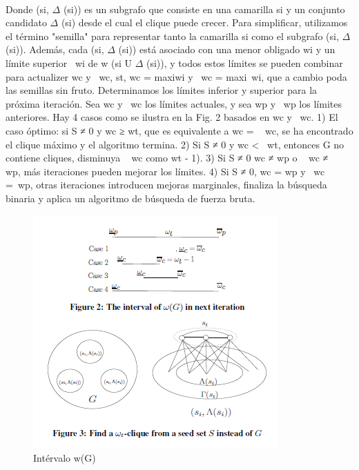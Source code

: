 \\
Donde (si, \begin{math}\Delta\end{math} (si)) es un subgrafo que consiste en una camarilla si y un conjunto candidato  \begin{math}\Delta\end{math} (si) desde el cual el clique puede crecer. Para simplificar, utilizamos el término "semilla" para representar tanto la camarilla si como el subgrafo (si,  \begin{math}\Delta\end{math} (si)). Además, cada (si,  \begin{math}\Delta\end{math} (si)) está asociado con una menor obligado wi y un límite superior ~wi de w (si U  \begin{math}\Delta\end{math} (si)), y todos estos límites se pueden combinar para actualizer wc y ~wc, st, wc = maxi{wi} y ~wc = maxi{~wi}, que a cambio poda las semillas sin fruto.
Determinamos los límites inferior y superior para la próxima iteración. Sea wc y ~wc los límites actuales, y sea wp y ~wp los límites anteriores. Hay 4 casos como se ilustra en la Fig. 2 basados en wc y ~wc.
1) El caso óptimo: si S ≠ 0 y wc ≥ wt, que es equivalente a wc = ~ wc, se ha encontrado el clique máximo y el algoritmo termina.
2) Si S ≠ 0 y wc < ~wt, entonces G no contiene cliques, disminuya ~ wc como wt - 1).
3) Si S ≠ 0 wc  ≠ wp o ~ wc ≠ ~ wp, más iteraciones pueden mejorar los límites.
4) Si S ≠ 0, wc = wp y ~wc =~wp, otras iteraciones introducen mejoras marginales, finaliza la búsqueda binaria y aplica un algoritmo de búsqueda de fuerza bruta.
\\
\begin{figure}[h!]
\centering
\includegraphics[scale=1.5]{img/imagen3.png}
\caption{Intérvalo w(G)}
\label{Comandos}
\end{figure}
\\
